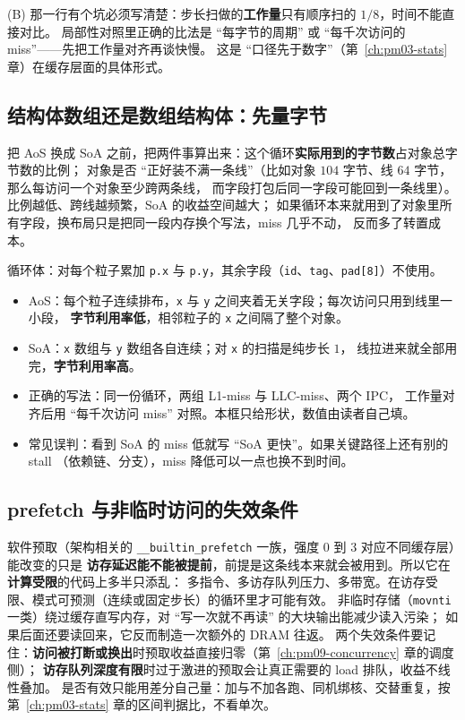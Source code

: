 \documentclass[12pt,a4paper,fontset=fandol]{ctexbook}
\newcommand{\Tp}[1]{\texttt{#1}}
\newcommand{\Bk}{\discretionary{}{}{}}
\newcommand{\Mx}[1]{\textsf{#1}}
\begin{document}
(B) 那一行有个坑必须写清楚：步长扫做的\textbf{工作量}只有顺序扫的 $1/8$，时间不能直接对比。
局部性对照里正确的比法是 ``每字节的周期'' 或 ``每千次访问的 miss''——先把工作量对齐再谈快慢。
这是 ``口径先于数字''（第~\ref{ch:pm03-stats} 章）在缓存层面的具体形式。

\subsection{结构体数组还是数组结构体：先量字节}

把 AoS 换成 SoA 之前，把两件事算出来：这个循环\textbf{实际用到的字节数}占对象总字节数的比例；
对象是否 ``正好装不满一条线''（比如对象 $104$ 字节、线 $64$ 字节，那么每访问一个对象至少跨两条线，
而字段打包后同一字段可能回到一条线里）。比例越低、跨线越频繁，SoA 的收益空间越大；
如果循环本来就用到了对象里所有字段，换布局只是把同一段内存换个写法，miss 几乎不动，
反而多了转置成本。

\begin{compare}[title={同一循环、两种布局的可观察形状（只给形状，不给数）},label={box:pm06-layout}]
循环体：对每个粒子累加 \Tp{p.x} 与 \Tp{p.y}，其余字段（\Tp{id}、\Tp{tag}、\Tp{pad[8]}）不使用。
\begin{itemize}
\item AoS：每个粒子连续排布，\Tp{x} 与 \Tp{y} 之间夹着无关字段；每次访问只用到线里一小段，
  \textbf{字节利用率低}，相邻粒子的 \Tp{x} 之间隔了整个对象。
\item SoA：\Tp{x} 数组与 \Tp{y} 数组各自连续；对 \Tp{x} 的扫描是纯步长 $1$，
  线拉进来就全部用完，\textbf{字节利用率高}。
\item 正确的写法：同一份循环，两组 \Mx{L1{\Bk}-miss} 与 \Mx{LLC{\Bk}-miss}、两个 \Mx{IPC}，
  工作量对齐后用 ``每千次访问 miss'' 对照。本框只给形状，数值由读者自己填。
\item 常见误判：看到 SoA 的 miss 低就写 ``SoA 更快''。如果关键路径上还有别的 stall
  （依赖链、分支），miss 降低可以一点也换不到时间。
\end{itemize}
\end{compare}

\subsection{prefetch 与非临时访问的失效条件}

软件预取（架构相关的 \Tp{\_\_builtin{\Bk}\_prefetch} 一族，强度 $0$ 到 $3$ 对应不同缓存层）能改变的只是
\textbf{访存延迟能不能被提前}，前提是这条线本来就会被用到。所以它在\textbf{计算受限}的代码上多半只添乱：
多指令、多访存队列压力、多带宽。在访存受限、模式可预测（连续或固定步长）的循环里才可能有效。
非临时存储（\Tp{movnti} 一类）绕过缓存直写内存，对 ``写一次就不再读'' 的大块输出能减少读入污染；
如果后面还要读回来，它反而制造一次额外的 DRAM 往返。
两个失效条件要记住：\textbf{访问被打断或换出}时预取收益直接归零（第~\ref{ch:pm09-concurrency} 章的调度侧）；
\textbf{访存队列深度有限}时过于激进的预取会让真正需要的 load 排队，收益不线性叠加。
是否有效只能用差分自己量：加与不加各跑、同机绑核、交替重复，按第~\ref{ch:pm03-stats} 章的区间判据比，不看单次。
\end{document}
